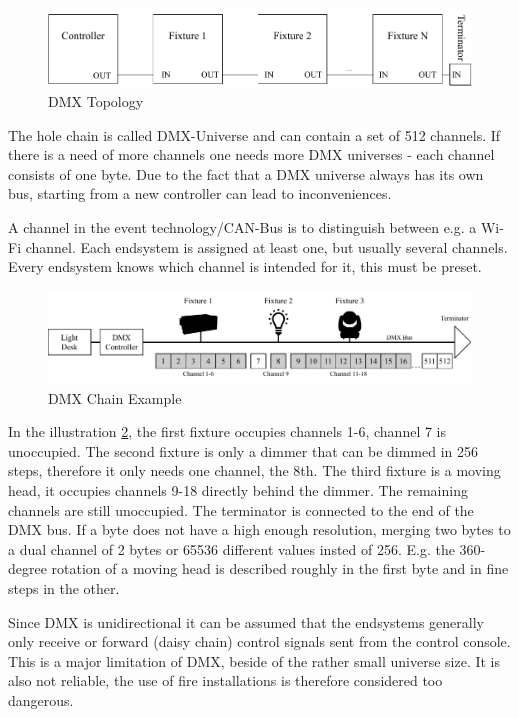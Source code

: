 \begin{figure}[h]
	\centering
	\includegraphics[scale=0.6]{figures/DMX_blockdiagram.pdf}
	\caption{DMX Topology}
	\label{fig:dmx_diagram}
\end{figure}

The hole chain is called DMX-Universe and can contain a set of 512 channels.
If there is a need of more channels one needs more DMX universes - each channel consists of one byte.
Due to the fact that a DMX universe always has its own bus, starting from a new controller can lead to inconveniences.

A channel in the event technology/CAN-Bus is to distinguish between e.g. a Wi-Fi channel.
Each endsystem is assigned at least one, but usually several channels.
Every endsystem knows which channel is intended for it, this must be preset.

\begin{figure}[h]
	\centering
	\includegraphics[scale=0.6]{figures/DMX_Chain.pdf}
	\caption{DMX Chain Example}
	\label{fig:dmx_chain}
\end{figure}

In the illustration \cref{fig:dmx_chain}, the first fixture occupies channels 1-6, channel 7 is unoccupied.
The second fixture is only a dimmer that can be dimmed in 256 steps, therefore it only needs one channel, the 8th.
The third fixture is a moving head, it occupies channels 9-18 directly behind the dimmer.
The remaining channels are still unoccupied.
The terminator is connected to the end of the DMX bus.
If a byte does not have a high enough resolution, merging two bytes to a dual channel of 2 bytes or 65536 different values insted of 256.
E.g. the 360-degree rotation of a moving head is described roughly in the first byte and in fine steps in the other.

Since \ac{DMX} is unidirectional it can be assumed that the endsystems generally only receive or forward (daisy chain) control signals sent from the control console.
This is a major limitation of DMX, beside of the rather small universe size.
It is also not reliable, the use of fire installations is therefore considered too dangerous.

